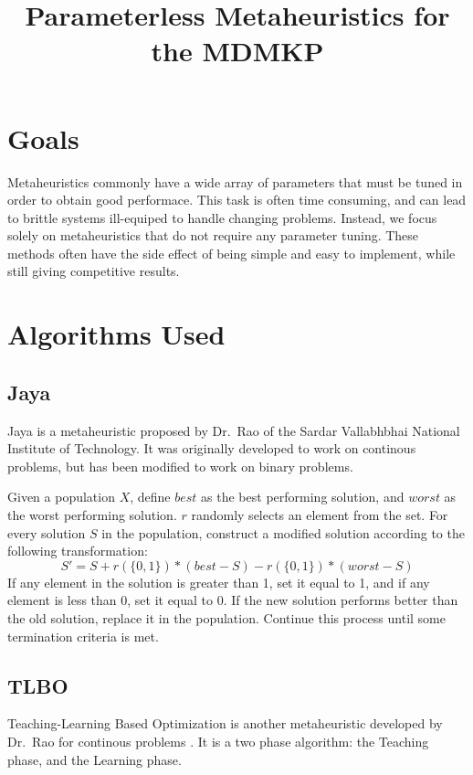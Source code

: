 \documentclass[11pt, letterpaper, onecolumn]{article}
\title{\textbf{Parameterless Metaheuristics for the MDMKP}}
\begin{document}
\maketitle

\section{Goals}

Metaheuristics commonly have a wide array of parameters that must be tuned in order to
obtain good performace. This task is often time consuming, and can lead to brittle systems
ill-equiped to handle changing problems. Instead, we focus solely on metaheuristics that
do not require any parameter tuning. These methods often have the side effect of being
simple and easy to implement, while still giving competitive results.

\section{Algorithms Used}

\subsection{Jaya}

Jaya is a metaheuristic proposed by Dr.~Rao of the Sardar Vallabhbhai National
Institute of Technology\cite{jaya}. It was originally developed to work on continous
problems, but has been modified to work on binary problems.

Given a population $X$, define $best$ as the best performing solution, and $worst$ as the worst performing solution. $r$ randomly selects an element from the set. For every solution $S$ in the population, construct a modified solution according to the following transformation:
\begin{equation} S' = S + r(\{0, 1\})*(best - S) - r(\{0, 1\})*(worst - S) \end{equation}
If any element in the solution is greater than 1, set it equal to 1, and if any element is less than 0, set it equal to 0. If the new solution performs better than the old solution, replace it in the population. Continue this process until some termination criteria is met.

\subsection{TLBO }

Teaching-Learning Based Optimization is another metaheuristic developed by Dr.~Rao for continous problems \cite{TLBO}. It is a two phase algorithm: the Teaching phase, and the Learning phase.
\end{document}
